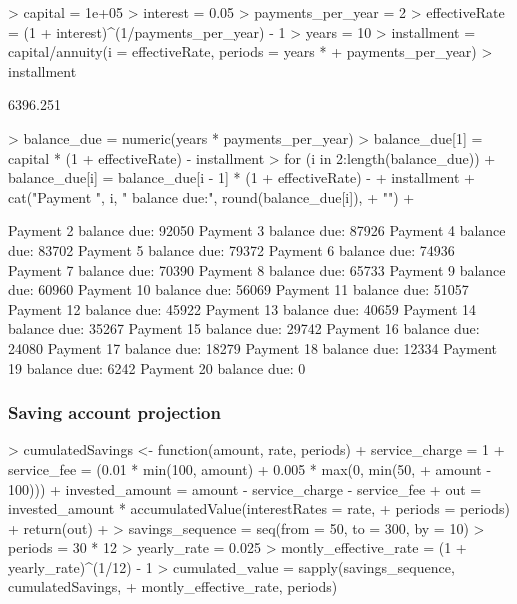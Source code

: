 \documentclass[a4paper]{article}
\begin{document}
\begin{Schunk}
\begin{Sinput}
> capital = 1e+05
> interest = 0.05
> payments_per_year = 2
> effectiveRate = (1 + interest)^(1/payments_per_year) - 1
> years = 10
> installment = capital/annuity(i = effectiveRate, periods = years * 
+     payments_per_year)
> installment
\end{Sinput}
\begin{Soutput}
[1] 6396.251
\end{Soutput}
\begin{Sinput}
> balance_due = numeric(years * payments_per_year)
> balance_due[1] = capital * (1 + effectiveRate) - installment
> for (i in 2:length(balance_due)) {
+     balance_due[i] = balance_due[i - 1] * (1 + effectiveRate) - 
+         installment
+     cat("Payment ", i, " balance due:", round(balance_due[i]), 
+         "\n")
+ }
\end{Sinput}
\begin{Soutput}
Payment  2  balance due: 92050 
Payment  3  balance due: 87926 
Payment  4  balance due: 83702 
Payment  5  balance due: 79372 
Payment  6  balance due: 74936 
Payment  7  balance due: 70390 
Payment  8  balance due: 65733 
Payment  9  balance due: 60960 
Payment  10  balance due: 56069 
Payment  11  balance due: 51057 
Payment  12  balance due: 45922 
Payment  13  balance due: 40659 
Payment  14  balance due: 35267 
Payment  15  balance due: 29742 
Payment  16  balance due: 24080 
Payment  17  balance due: 18279 
Payment  18  balance due: 12334 
Payment  19  balance due: 6242 
Payment  20  balance due: 0 
\end{Soutput}
\end{Schunk}

\subsubsection{Saving account projection}

\begin{Schunk}
\begin{Sinput}
> cumulatedSavings <- function(amount, rate, periods) {
+     service_charge = 1
+     service_fee = (0.01 * min(100, amount) + 0.005 * max(0, min(50, 
+         amount - 100)))
+     invested_amount = amount - service_charge - service_fee
+     out = invested_amount * accumulatedValue(interestRates = rate, 
+         periods = periods)
+     return(out)
+ }
> savings_sequence = seq(from = 50, to = 300, by = 10)
> periods = 30 * 12
> yearly_rate = 0.025
> montly_effective_rate = (1 + yearly_rate)^(1/12) - 1
> cumulated_value = sapply(savings_sequence, cumulatedSavings, 
+     montly_effective_rate, periods)
\end{Sinput}
\end{Schunk}
\end{document}
